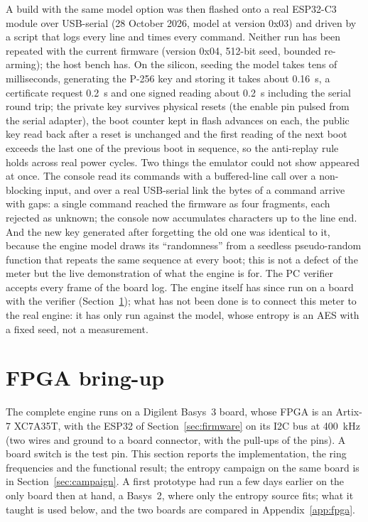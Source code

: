 A build with the same model option was then flashed onto a real ESP32-C3
module over USB-serial (28 October 2026, model at version 0x03) and
driven by a script that logs every line and times every command. Neither
run has been repeated with the current firmware (version 0x04, 512-bit
seed, bounded re-arming); the host bench has. On the silicon, seeding
the model takes tens of milliseconds,
generating the P-256 key and storing it takes about 0.16~s, a certificate
request 0.2~s and one signed reading about 0.2~s including the serial
round trip; the private key survives physical resets (the enable pin
pulsed from the serial adapter), the boot counter kept in flash advances
on each, the public key read back after a reset is unchanged and the
first reading of the next boot exceeds the last one of the previous boot
in sequence, so the anti-replay rule holds across real power cycles. Two
things the emulator could not show appeared at once. The console read its
commands with a buffered-line call over a non-blocking input, and over a
real USB-serial link the bytes of a command arrive with gaps: a single
command reached the firmware as four fragments, each rejected as unknown;
the console now accumulates characters up to the line end. And the new key
generated after forgetting the old one was identical to it, because the
engine model draws its ``randomness'' from a seedless pseudo-random
function that repeats the same sequence at every boot; this is not a
defect of the meter but the live demonstration of what the engine is for.
The PC verifier accepts every frame of the board log. The engine itself
has since run on a board with the verifier
(Section~\ref{sec:bringup}); what has not been done is to connect this
meter to the real engine: it has only run against the model, whose
entropy is an AES with a fixed seed, not a measurement.

\section{FPGA bring-up}
\label{sec:bringup}

The complete engine runs on a Digilent Basys~3 board, whose \ac{FPGA} is
an Artix-7 XC7A35T, with the ESP32 of Section~\ref{sec:firmware} on its
\ac{I2C} bus at 400~kHz (two wires and ground to a board connector, with
the pull-ups of the pins). A board switch is the test pin. This section
reports the implementation, the ring frequencies and the functional
result; the entropy campaign on the same board is in
Section~\ref{sec:campaign}. A first prototype had run a few days earlier
on the only board then at hand, a Basys~2, where only the entropy source
fits; what it taught is used below, and the two boards are compared in
Appendix~\ref{app:fpga}.


